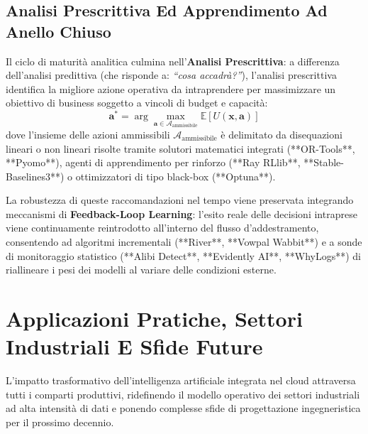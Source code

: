 \documentclass[11pt, a4paper]{article}
\begin{document}

\subsection{Analisi Prescrittiva Ed Apprendimento Ad Anello Chiuso}

Il ciclo di maturità analitica culmina nell'\textbf{Analisi Prescrittiva}: a differenza dell'analisi predittiva (che risponde a: \emph{``cosa accadrà?''}), l'analisi prescrittiva identifica la migliore azione operativa da intraprendere per massimizzare un obiettivo di business soggetto a vincoli di budget e capacità:
\begin{equation}
    \bm{a}^* = \arg\max_{\bm{a} \in \mathcal{A}_{\text{ammissibile}}} \mathbb{E}[U(\bm{x}, \bm{a})]
\end{equation}
dove l'insieme delle azioni ammissibili $\mathcal{A}_{\text{ammissibile}}$ è delimitato da disequazioni lineari o non lineari risolte tramite solutori matematici integrati (**OR-Tools**, **Pyomo**), agenti di apprendimento per rinforzo (**Ray RLlib**, **Stable-Baselines3**) o ottimizzatori di tipo black-box (**Optuna**).

La robustezza di queste raccomandazioni nel tempo viene preservata integrando meccanismi di \textbf{Feedback-Loop Learning}: l'esito reale delle decisioni intraprese viene continuamente reintrodotto all'interno del flusso d'addestramento, consentendo ad algoritmi incrementali (**River**, **Vowpal Wabbit**) e a sonde di monitoraggio statistico (**Alibi Detect**, **Evidently AI**, **WhyLogs**) di riallineare i pesi dei modelli al variare delle condizioni esterne.

\newpage

\section{Applicazioni Pratiche, Settori Industriali E Sfide Future}

L'impatto trasformativo dell'intelligenza artificiale integrata nel cloud attraversa tutti i comparti produttivi, ridefinendo il modello operativo dei settori industriali ad alta intensità di dati e ponendo complesse sfide di progettazione ingegneristica per il prossimo decennio.

\end{document}

